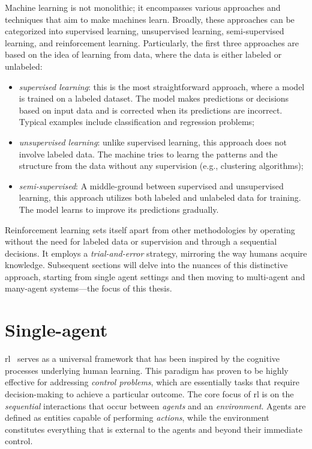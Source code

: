 Machine learning is not monolithic; 
 it encompasses various approaches and techniques that aim to make machines learn. 
 Broadly, these approaches can be categorized into supervised learning, unsupervised learning, semi-supervised learning, and reinforcement learning.
%
Particularly, the first three approaches are based on the idea of learning from data, 
 where the data is either labeled or unlabeled:
\begin{itemize}
  \item \emph{supervised learning}: this is the most straightforward approach, where a model is trained on a labeled dataset. 
  The model makes predictions or decisions based on input data and is corrected when its predictions are incorrect. Typical examples include classification and regression problems;
  \item \emph{unsupervised learning}: unlike supervised learning, this approach does not involve labeled data. 
  The machine tries to learng the patterns and the structure from the data without any supervision (e.g., clustering algorithms);
  \item \emph{semi-supervised}: A middle-ground between supervised and unsupervised learning, this approach utilizes both labeled and unlabeled data for training. The model learns to improve its predictions gradually.
\end{itemize}
Reinforcement learning sets itself apart from other methodologies by operating without the need for labeled data or supervision and through a sequential decisions. 
 It employs a \emph{trial-and-error} strategy, mirroring the way humans acquire knowledge. 
 Subsequent sections will delve into the nuances of this distinctive approach, starting from single agent settings and then moving to multi-agent and many-agent systems---the focus of this thesis.
\section{Single-agent}
\Acl{rl}~\cite{sutton2018reinforcement-learning} serves as a universal framework that has been inspired by the cognitive processes underlying human learning. 
 This paradigm has proven to be highly effective for addressing \emph{control problems}, which are essentially tasks that require decision-making to achieve a particular outcome.
%
The core focus of \ac{rl} is on the \emph{sequential} interactions that occur between \emph{agents} and an \emph{environment}. 
 Agents are defined as entities capable of performing \emph{actions}, while the environment constitutes everything that is external to the agents and beyond their immediate control.

